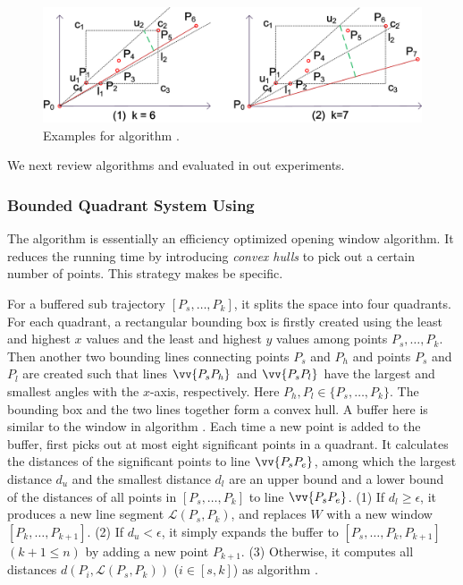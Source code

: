 \begin{figure}[tb!]
\centering
\includegraphics[scale = 0.66]{Figures/Fig-BQS.png}
\vspace{-2ex}
\caption{{\small Examples for algorithm \bqsa.}}
\label{fig:bqs}
\vspace{-3ex}
\end{figure}


We next review algorithms \bqsa and \squishe evaluated in out experiments.

\vspace{-0.5ex}
\subsubsection{Bounded Quadrant System Using \ped}
The \bqsa algorithm \cite{Liu:BQS} is essentially an efficiency optimized opening window algorithm\cite{Meratnia:Spatiotemporal}. It reduces the running time by introducing \textit{convex hulls} to pick out a certain number of points. This strategy makes \bqsa be \ped specific.

For a buffered sub trajectory $[P_s, \ldots, P_k]$, it splits the space into four quadrants. For each quadrant, a rectangular bounding box is firstly created using the least and highest $x$ values and the least and highest $y$ values among points $P_s,\ldots,P_k$. Then another two bounding lines connecting points $P_s$ and $P_{h}$ and points $P_s$ and $P_{l}$ are created such that lines $\vv{P_sP_{h}}$ and $\vv{P_sP_{l}}$ have the largest and smallest angles with the $x$-axis, respectively.
Here $P_{h},P_{l} \in\{P_s,\ldots,P_k\}$. The bounding box and the two lines together form a convex hull.
A buffer here is similar to the window in algorithm \opwa\cite{Meratnia:Spatiotemporal}.
Each time a new point is added to the buffer, \bqsa first picks out at most eight significant points in a quadrant. It calculates the distances of the significant points to line $\vv{P_sP_e}$, among which the largest distance $d_{u}$ and the smallest distance $d_l$ are an upper bound and  a lower bound of the distances of all points in $[P_s, \ldots, P_k]$ to line $\vv{P_sP_e}$.
(1) If $d_l\ge \epsilon$, it produces a new line segment $\mathcal{L}(P_{s}, P_{k})$, and replaces $W$ with a new window $[P_{k},\ldots,P_{k+1}]$.
(2) If $d_u < \epsilon$, it simply expands the buffer to $[P_s, \ldots, P_k, P_{k+1}]$ $(k+1\le n)$ by adding a new point $P_{k+1}$.
(3) Otherwise, it computes all distances $d(P_i, {\mathcal{L}(P_s,P_k)})$ ($i\in[s, k]$) as algorithm \dpa.

